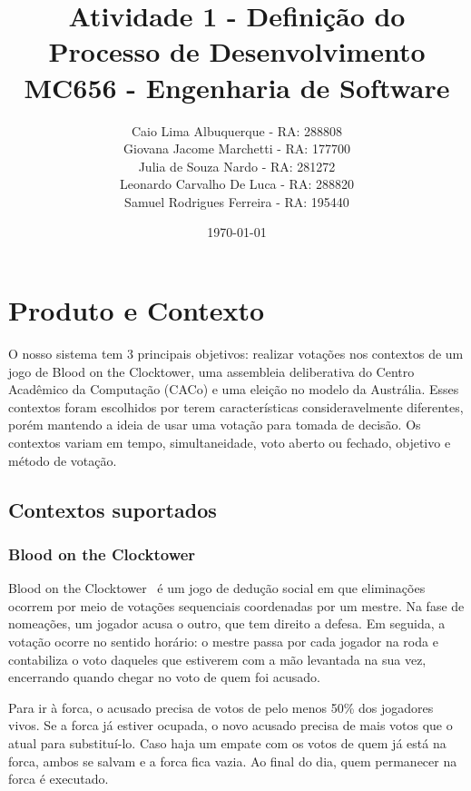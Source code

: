 \documentclass[12pt,a4paper]{article}
\title{\textbf{Atividade 1 - Definição do\\Processo de Desenvolvimento}\\
\large MC656 - Engenharia de Software}
\author{
  Caio Lima Albuquerque - RA: 288808 \\
  Giovana Jacome Marchetti - RA: 177700 \\
  Julia de Souza Nardo - RA: 281272 \\
  Leonardo Carvalho De Luca - RA: 288820\\
  Samuel Rodrigues Ferreira - RA: 195440
}
\date{\today}
\begin{document}
\maketitle

\section{Produto e Contexto}



O nosso sistema tem 3 principais objetivos: realizar votações nos contextos de um jogo de Blood on the Clocktower, uma assembleia deliberativa do Centro Acadêmico da Computação (CACo) e uma eleição no modelo da Austrália. Esses contextos foram escolhidos por terem características consideravelmente diferentes, porém mantendo a ideia de usar uma votação para tomada de decisão. Os contextos variam em tempo, simultaneidade, voto aberto ou fechado, objetivo e método de votação.

\subsection{Contextos suportados}

\subsubsection{Blood on the Clocktower}
Blood on the Clocktower~\cite{bloodontheclocktower} é um jogo de dedução social em que eliminações ocorrem por meio de votações sequenciais coordenadas por um mestre. Na fase de nomeações, um jogador acusa o outro, que tem direito a defesa. Em seguida, a votação ocorre no sentido horário: o mestre passa por cada jogador na roda e contabiliza o voto daqueles que estiverem com a mão levantada na sua vez, encerrando quando chegar no voto de quem foi acusado.

Para ir à forca, o acusado precisa de votos de pelo menos 50\% dos jogadores vivos. Se a forca já estiver ocupada, o novo acusado precisa de mais votos que o atual para substituí-lo. Caso haja um empate com os votos de quem já está na forca, ambos se salvam e a forca fica vazia. Ao final do dia, quem permanecer na forca é executado.
\end{document}
